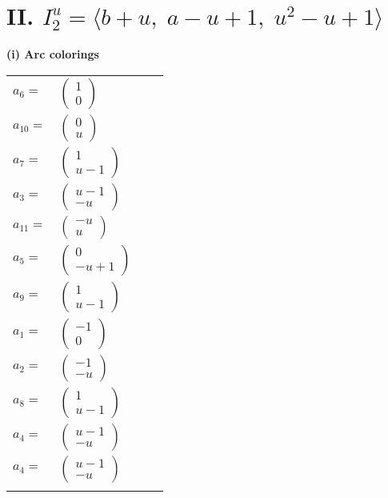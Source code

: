 \documentclass[1p]{elsarticle_modified}
\theoremstyle{definition}
\begin{document}
\centering \section*{II. $I^u_{2}= \langle b+u,\;a- u+1,\;u^2- u+1 \rangle$}
\flushleft \textbf{(i) Arc colorings}\\
\begin{tabular}{m{7pt} m{180pt} m{7pt} m{180pt} }
\flushright $a_{6}=$&$\begin{pmatrix}1\\0\end{pmatrix}$ \\
\flushright $a_{10}=$&$\begin{pmatrix}0\\u\end{pmatrix}$ \\
\flushright $a_{7}=$&$\begin{pmatrix}1\\u-1\end{pmatrix}$ \\
\flushright $a_{3}=$&$\begin{pmatrix}u-1\\- u\end{pmatrix}$ \\
\flushright $a_{11}=$&$\begin{pmatrix}- u\\u\end{pmatrix}$ \\
\flushright $a_{5}=$&$\begin{pmatrix}0\\- u+1\end{pmatrix}$ \\
\flushright $a_{9}=$&$\begin{pmatrix}1\\u-1\end{pmatrix}$ \\
\flushright $a_{1}=$&$\begin{pmatrix}-1\\0\end{pmatrix}$ \\
\flushright $a_{2}=$&$\begin{pmatrix}-1\\- u\end{pmatrix}$ \\
\flushright $a_{8}=$&$\begin{pmatrix}1\\u-1\end{pmatrix}$ \\
\flushright $a_{4}=$&$\begin{pmatrix}u-1\\- u\end{pmatrix}$\\ \flushright $a_{4}=$&$\begin{pmatrix}u-1\\- u\end{pmatrix}$\\&\end{tabular}
\end{document}
